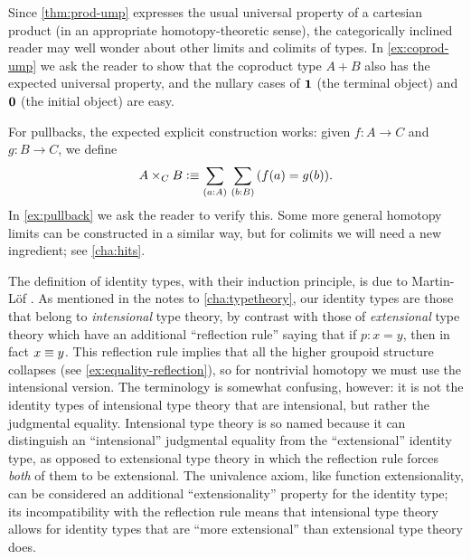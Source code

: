 %
%
%
%
Since \autoref{thm:prod-ump} expresses the usual universal property of a cartesian product (in an appropriate homotopy-theoretic sense), the categorically inclined reader may well wonder about other limits and colimits of types.
In \autoref{ex:coprod-ump} we ask the reader to show that the coproduct type $A+B$ also has the expected universal property, and the nullary cases of $\mathbf{1}$ (the terminal object) and $\mathbf{0}$ (the initial object) are easy.
%
%
%
%

%
For pullbacks, the expected explicit construction works: given $f:A\to C$ and $g:B\to C$, we define
\begin{equation}
  A\times_C B \defeq \sm{a:A}{b:B} (f(a)=g(b)).\label{eq:defn-pullback}
\end{equation}
In \autoref{ex:pullback} we ask the reader to verify this.
Some more general homotopy limits can be constructed in a similar way, but for colimits we will need a new ingredient; see \autoref{cha:hits}.

%

\sectionNotes

The definition of identity types, with their induction principle, is due to Martin-L\"of \cite{Martin-Lof-1972}.
%
%
%
%
%
As mentioned in the notes to \autoref{cha:typetheory}, our identity types are those that belong to \emph{intensional} type theory, by contrast with those of \emph{extensional} type theory which have an additional ``reflection rule'' saying that if $p:x=y$, then in fact $x\equiv y$.
This reflection rule implies that all the higher groupoid structure collapses (see \autoref{ex:equality-reflection}), so for nontrivial homotopy we must use the intensional version.
The terminology is somewhat confusing, however: it is not the identity types of intensional type theory that are intensional, but rather the judgmental equality.
Intensional type theory is so named because it can distinguish an ``intensional'' judgmental equality from the ``extensional'' identity type, as opposed to extensional type theory in which the reflection rule forces \emph{both} of them to be extensional.
The univalence axiom, like function extensionality, can be considered an additional ``extensionality'' property for the identity type; its incompatibility with the reflection rule means that intensional type theory allows for identity types that are ``more extensional'' than extensional type theory does.

